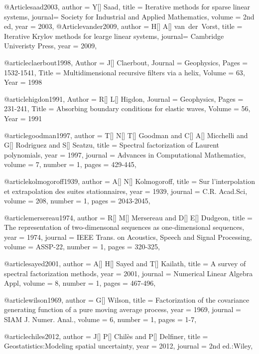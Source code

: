 @Article{saad2003,
  author = 	 {Y[] Saad},
  title  = 	 {Iterative methods for sparse linear systems},
  journal= 	 {Society for Industrial and Applied Mathematics},
  volume =	 {2nd ed},
  year   = 	 2003,
}
@Article{vander2009,
  author = 	 {H[] A[] van~der~Vorst},
  title  = 	 {Iterative Krylov methods for learge linear systems},
  journal= 	 {Cambridge Univeristy Press},
  year   = 	 2009,
}


@article{claerbout1998,
	Author = {J[] Claerbout},
	Journal = {Geophysics},
	Pages = {1532-1541},
	Title = {Multidimensional recursive filters via a helix},
	Volume = {63},
	Year = {1998}}

@article{higdon1991,
	Author = {R[] L[] Higdon},
	Journal = {Geophysics},
	Pages = {231-241},
	Title = {Absorbing boundary conditions for elastic waves},
	Volume = {56},
	Year = {1991}}
	



@article{goodman1997,
  author =	 {T[] N[] T[] Goodman and C[] A[] Micchelli and G[] Rodriguez and S[] Seatzu},
  title =	 {Spectral factorization of Laurent polynomials},
  year =	 1997,
  journal =	 {Advances in Computational Mathematics},
  volume =	 7,
  number =	 1,
  pages =	 {429-445},
}

@article{kolmogoroff1939,
  author =	 {A[] N[] Kolmogoroff},
  title =	 {Sur l'interpolation et extrapolation des suites stationnaires},
  year =	 1939,
  journal =	 {C.R. Acad.Sci},
  volume =	 208,
  number =	 1,
  pages =	 {2043-2045},
}

@article{mersereau1974,
  author =	 {R[] M[] Mersereau and D[] E[] Dudgeon},
  title =	 {The representation of two-dimensonal sequences as one-dimensional sequences},
  year =	 1974,
  journal =	 {IEEE Trans. on Acoustics, Speech and Signal Processing},
  volume =	 ASSP-22,
  number =	 1,
  pages =	 {320-325},
}

@article{sayed2001,
  author =	 {A[] H[] Sayed and T[] Kailath},
  title =	 {A survey of spectral factorization methods},
  year =	 2001,
  journal =	 {Numerical Linear Algebra Appl},
  volume =	 8,
  number =	 1,
  pages =	 {467-496},
}

@article{wilson1969,
  author =	 {G[] Wilson},
  title =	 {Factorization of the covariance generating function of a pure moving average process},
  year =	 1969,
  journal =	 {SIAM J. Numer. Anal.},
  volume =	 6,
  number =	 1,
  pages =	 {1-7},
}

@article{chiles2012,
  author =	 {J[] P[] Chil\`{e}s and P[] Delfiner},
  title =	 {Geostatistics:Modeling spatial uncertainty},
  year =	 2012,
  journal =	 {2nd ed.:Wiley},
}

